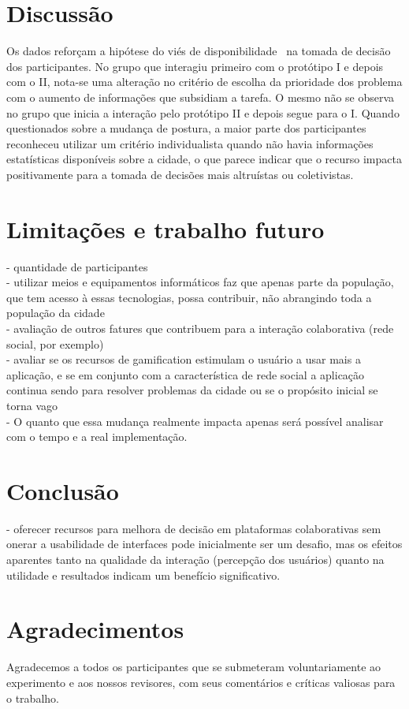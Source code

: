 \documentclass{sigchi}
\begin{document}
\section{Discussão}
Os dados reforçam a hipótese do viés de disponibilidade~\cite{tversky:1973} na tomada de decisão dos participantes. No grupo que interagiu primeiro com o protótipo I e depois com o II, nota-se uma alteração no critério de escolha da prioridade dos problema com o aumento de informações que subsidiam a tarefa. O mesmo não se observa no grupo que inicia a interação pelo protótipo II e depois segue para o I. Quando questionados sobre a mudança de postura, a maior parte dos participantes reconheceu utilizar um critério individualista quando não havia informações estatísticas disponíveis sobre a cidade, o que parece indicar que o recurso impacta positivamente para a tomada de decisões mais altruístas ou coletivistas.

\section{Limitações e trabalho futuro}
- quantidade de participantes\\
- utilizar meios e equipamentos informáticos faz que apenas parte da população, que tem acesso à essas tecnologias, possa contribuir, não abrangindo toda a população da cidade\\
- avaliação de outros fatures que contribuem para a interação colaborativa (rede social, por exemplo)\\
- avaliar se os recursos de gamification estimulam o usuário a usar mais a aplicação, e se em conjunto com a característica de rede social a aplicação continua sendo para resolver problemas da cidade ou se o propósito inicial se torna vago\\
- O quanto que essa mudança realmente impacta apenas será possível analisar com o tempo e a real implementação.

\section{Conclusão}
- oferecer recursos para melhora de decisão em plataformas colaborativas sem onerar a usabilidade de interfaces pode inicialmente ser um desafio, mas os efeitos aparentes tanto na qualidade da interação (percepção dos usuários) quanto na utilidade e resultados indicam um benefício significativo.


\section{Agradecimentos}

Agradecemos a todos os participantes que se submeteram voluntariamente ao experimento e aos nossos revisores, com seus comentários e críticas valiosas para o trabalho.


\balance{}


\balance{}



\end{document}
